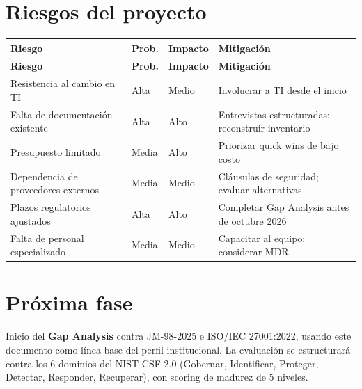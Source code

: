 \documentclass[11pt,a4paper]{article}
\begin{document}
	
	\section{Riesgos del proyecto}
	
	\begin{longtable}{@{}p{6.2cm}p{1cm}p{1.25cm}p{6cm}@{}}
		\toprule
		\textbf{Riesgo} & \textbf{Prob.} & \textbf{Impacto} & \textbf{Mitigación} \\ \midrule
		\endfirsthead
		\toprule
		\textbf{Riesgo} & \textbf{Prob.} & \textbf{Impacto} & \textbf{Mitigación} \\ \midrule
		\endhead
		Resistencia al cambio en TI & Alta & Medio & Involucrar a TI desde el inicio \\
		Falta de documentación existente & Alta & Alto & Entrevistas estructuradas; reconstruir inventario \\
		Presupuesto limitado & Media & Alto & Priorizar quick wins de bajo costo \\
		Dependencia de proveedores externos & Media & Medio & Cláusulas de seguridad; evaluar alternativas \\
		Plazos regulatorios ajustados & Alta & Alto & Completar Gap Analysis antes de octubre 2026 \\
		Falta de personal especializado & Media & Medio & Capacitar al equipo; considerar MDR \\ \bottomrule
	\end{longtable}
	
	
	\section{Próxima fase}
	
	Inicio del \textbf{Gap Analysis} contra JM-98-2025 e ISO/IEC 27001:2022, usando este documento como línea base del perfil institucional. La evaluación se estructurará contra los 6 dominios del NIST CSF 2.0 (Gobernar, Identificar, Proteger, Detectar, Responder, Recuperar), con scoring de madurez de 5 niveles.
	
	
\end{document}
